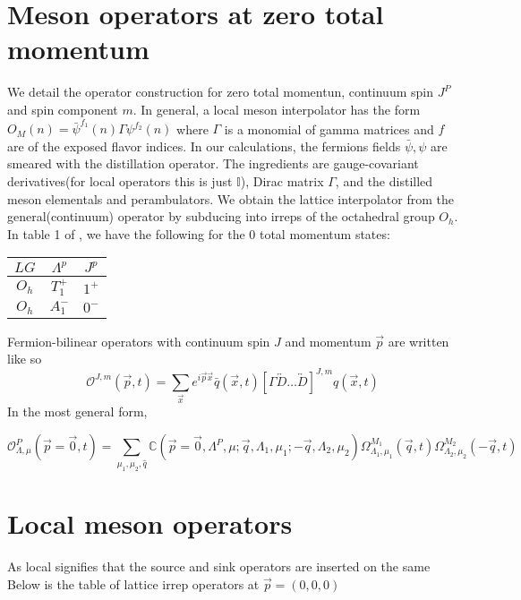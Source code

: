 \section{Meson operators at zero total momentum}
We detail the operator construction for zero total momentun, continuum spin $J^P$ and spin component $m$. In general, a local meson interpolator has the form $O_M(n) = \bar{\psi}^{f_1}(n)\Gamma\psi^{f_2}(n)$ where $\Gamma$ is a monomial of gamma matrices and $f$ are of the exposed flavor indices. In our calculations, the fermions fields $\bar{\psi},\psi$ are smeared with the distillation operator. The ingredients are gauge-covariant derivatives(for local operators this is just $\mathbb{I}$), Dirac matrix $\Gamma$, and the distilled meson elementals and perambulators. We obtain the lattice interpolator from the general(continuum) operator by subducing into irreps of the octahedral group $O_h$. In table 1 of \cite{Cheung_2017}, we have the following for the 0 total momentum states: 
\begin{table}
    \begin{tabular}{ccc}
    $LG$ & $\Lambda^p$ & $J^p$ \\
    \hline
    $O_h$ & $T_1^+$ & $1^+$ \\
    $O_h$ & $A_1^-$ & $0^-$ \\
\end{tabular}
\end{table}
Fermion-bilinear operators with continuum spin $J$ and momentum $\vec{p}$ are written like so \cite{Cheung_2017}
    \begin{equation}
    \mathcal{O}^{J,m}(\vec{p},t) = \sum_{\vec{x}} e^{i\vec{p}\vec{x}} \bar{q}(\vec{x},t) [\Gamma \overleftrightarrow{D}\dots \overleftrightarrow{D}]^{J,m}q(\vec{x},t)
\end{equation}
In the most general form,

\begin{equation}
    \mathcal{O}_{\Lambda,\mu}^P(\vec{p}=\vec{0},t) = \sum_{\mu_1,\mu_2,\hat{q}} \mathbb{C}(\vec{p} = \vec{0},\Lambda^P,\mu;\vec{q},\Lambda_1,\mu_1;-\vec{q},\Lambda_2,\mu_2) \Omega^{M_1}_{\Lambda_1,\mu_1}(\vec{q},t) \Omega^{M_2}_{\Lambda_2,\mu_2}(-\vec{q},t)
\end{equation}

\section{Local meson operators}

As local signifies that the source and sink operators are inserted on the same
Below is the table of lattice irrep operators at $\vec{p} = (0,0,0)$ \cite{Dudek_2008}

